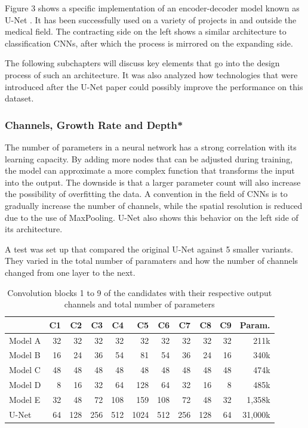 Figure 3 shows a specific implementation of an encoder-decoder model known as U-Net \cite{Ronneberger2015a}. It has been successfully used on a variety of projects in and outside the medical field. The contracting side on the left shows a similar architecture to classification CNNs, after which the process is mirrored on the expanding side.

The following subchapters will discuss key elements that go into the design process of such an architecture. It was also analyzed how technologies that were introduced after the U-Net paper could possibly improve the performance on this dataset.

\subsubsection{Channels, Growth Rate and Depth*}

The number of parameters in a neural network has a strong correlation with its learning capacity. By adding more nodes that can be adjusted during training, the model can approximate a more complex function that transforms the input into the output. The downside is that a larger parameter count will also increase the possibility of overfitting the data. A convention in the field of CNNs is to gradually increase the number of channels, while the spatial resolution is reduced due to the use of MaxPooling. U-Net also shows this behavior on the left side of its architecture.

A test was set up that compared the original U-Net against 5 smaller variants. They varied in the total number of paramaters and how the number of channels changed from one layer to the next.

\begin{table}[h!]
    \centering
    \begin{tabular}{| l || r | r | r | r | r | r | r | r | r || r |}
    \hline
            & C1   & C2   & C3   & C4   & C5   & C6   & C7   & C8   & C9  & Param. \\ 
    \hline
    Model A &   32 &   32 &   32 &   32 &   32 &   32 &   32 &   32 &  32 & 211k      \\
    \hline
    Model B &   16 &   24 &   36 &   54 &   81 &   54 &   36 &   24 &  16 & 340k      \\
    \hline
    Model C &   48 &   48 &   48 &   48 &   48 &   48 &   48 &   48 &  48 & 474k      \\
    \hline
    Model D &    8 &   16 &   32 &   64 &  128 &   64 &   32 &   16 &   8 & 485k      \\
    \hline
    Model E &   32 &   48 &   72 &  108 &  159 &  108 &   72 &   48 &  32 & 1,358k      \\
    \hline
    U-Net   &   64 &  128 &  256 &  512 & 1024 &  512 &  256 &  128 &  64 & 31,000k      \\
    \hline
    \end{tabular}
    \caption{Convolution blocks 1 to 9 of the candidates with their respective output channels and total number of parameters}
\end{table}

